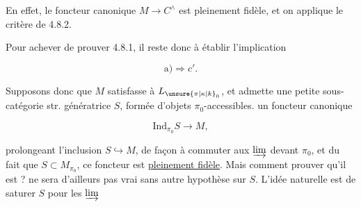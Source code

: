 


En effet, le foncteur canonique $M\longrightarrow C^{\wedge}$ est pleinement fidèle, et on applique le critère  de 4.8.2.

Pour achever de prouver 4.8.1, il reste donc à établir l'implication

\[ \mathrm a)\Longrightarrow c'. \]


Supposons donc que $M$ satisfasse à $L_{\unsure{\pi|\kappa|k}_0}$, et admette une petite sous-catégorie str. génératrice $S$, formée d'objets $\pi_0$-accessibles.    un foncteur canonique

\[ \mathrm{Ind}_{\pi_0}S\longrightarrow M, \]

prolongeant l'inclusion  $S\hookrightarrow M$, de façon à commuter aux $\varinjlim$  devant $\pi_0$, et du fait que $S\subset M_{\pi_0}$, ce foncteur est \uline{pleinement fidèle}. Mais comment prouver qu'il est  ?  ne sera d'ailleurs pas vrai  sans autre hypothèse sur $S$.  L'idée naturelle est de saturer $S$ pour les $\varinjlim$
